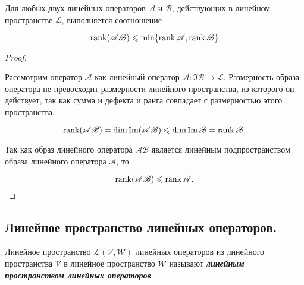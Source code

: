Для любых двух линейных операторов $\mathscr{A}$ и $\mathscr{B}$, действующих в линейном пространстве $\mathcal{L}$, выполняется соотношение

$$\operatorname{\mathop{\mathrm{rank}}}(\mathscr{A}\mathscr{B}) \leqslant \min\{\operatorname{\mathop{\mathrm{rank}}}\mathscr{A}, \operatorname{\mathop{\mathrm{rank}}}\mathscr{B}\}$$

\begin{proof}~

    Рассмотрим оператор $\mathscr{A}$ как линейный оператор $\mathscr{A}\colon \Im\mathscr{B} \to \mathcal{L}$. Размерность образа оператора не превосходит размерности линейного пространства, из которого он действует, так как сумма и дефекта и ранга совпадает с размерностью этого пространства.

    $$\operatorname{\mathop{\mathrm{rank}}}(\mathscr{A}\mathscr{B}) = \dim \operatorname{\mathop{\mathrm{Im}}} (\mathscr{A}\mathscr{B}) \leqslant \dim \operatorname{\mathop{\mathrm{Im}}} \mathscr{B} = \operatorname{\mathop{\mathrm{rank}}} \mathscr{B}.$$
    
    Так как образ линейного оператора $\mathscr{A}\mathscr{B}$ является линейным подпространством образа линейного оператора $\mathscr{A}$, то
    
    $$\operatorname{\mathop{\mathrm{rank}}}(\mathscr{A}\mathscr{B}) \leqslant \operatorname{\mathop{\mathrm{rank}}} \mathscr{A}.$$
\end{proof}


\newpage


\subsection{
    Линейное пространство линейных операторов.
}

\begin{definition}
    Линейное пространство $\mathcal{L}(\mathcal{V}, \mathcal{W})$ линейных операторов из линейного пространства $\mathcal{V}$ в линейное пространство $\mathcal{W}$ называют \textbf{\textit{линейным пространством линейных операторов}}.
\end{definition}

